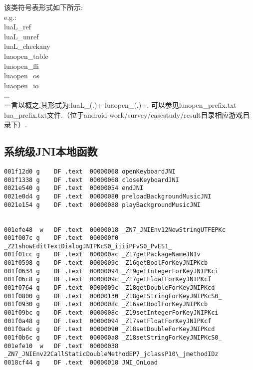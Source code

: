 该类符号表形式如下所示:\\
e.g.:\\
	luaL\_ref\\
	luaL\_unref\\
	luaL\_checkany\\
	luaopen\_table\\
	luaopen\_ffi\\
	luaopen\_os\\
	luaopen\_io\\
	...\\
一言以概之,其形式为:luaL\_(.)+ luaopen\_(.)+.
可以参见luaopen\_prefix.txt  lua\_prefix.txt文件.（位于android-work/survey/casestudy/result目录相应游戏目录下）.

\subsection{系统级JNI本地函数}
\label{sec:so:sysjnilib}
\begin{lstlisting}
001f12d0 g    DF .text  00000068 openKeyboardJNI
001f1338 g    DF .text  00000068 closeKeyboardJNI
0021e540 g    DF .text  00000054 endJNI
0021e0d4 g    DF .text  00000080 preloadBackgroundMusicJNI
0021e154 g    DF .text  00000088 playBackgroundMusicJNI


001efe48  w   DF .text  00000018 _ZN7_JNIEnv12NewStringUTFEPKc
001f007c g    DF .text  000000f0 _Z21showEditTextDialogJNIPKcS0_iiiiPFvS0_PvES1_
001f01cc g    DF .text  000000ac _Z17getPackageNameJNIv
001f0598 g    DF .text  0000009c _Z16getBoolForKeyJNIPKcb
001f0634 g    DF .text  00000094 _Z19getIntegerForKeyJNIPKci
001f06c8 g    DF .text  0000009c _Z17getFloatForKeyJNIPKcf
001f0764 g    DF .text  0000009c _Z18getDoubleForKeyJNIPKcd
001f0800 g    DF .text  00000130 _Z18getStringForKeyJNIPKcS0_
001f0930 g    DF .text  0000008c _Z16setBoolForKeyJNIPKcb
001f09bc g    DF .text  0000008c _Z19setIntegerForKeyJNIPKci
001f0a48 g    DF .text  00000094 _Z17setFloatForKeyJNIPKcf
001f0adc g    DF .text  00000090 _Z18setDoubleForKeyJNIPKcd
001f0b6c g    DF .text  000000a8 _Z18setStringForKeyJNIPKcS0_
001efe10  w   DF .text  00000038 _ZN7_JNIEnv22CallStaticDoubleMethodEP7_jclassP10\_jmethodIDz
0018cf44 g    DF .text  00000018 JNI_OnLoad
\end{lstlisting}

